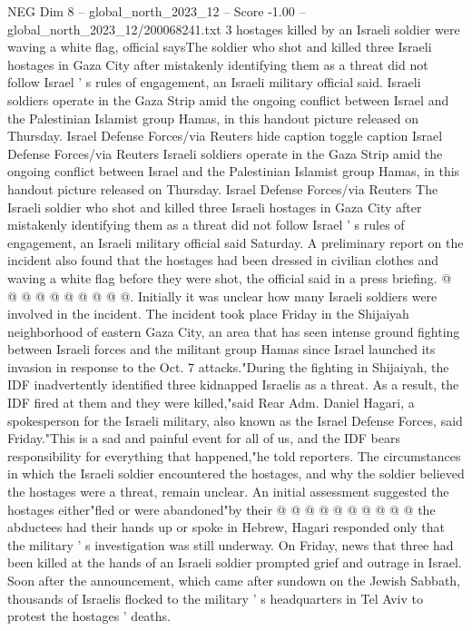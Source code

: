 \begin{textsample}{NEG Dim 8 – global\_north\_2023\_12 – Score -1.00 – global\_north\_2023\_12/200068241.txt}  \label{ex:f8_neg_171}
3 hostages killed by an Israeli soldier were waving a white flag, official saysThe soldier who shot and killed three Israeli hostages in Gaza City after mistakenly identifying them as a threat did not follow Israel ' s rules of engagement, an Israeli military official said.
Israeli soldiers operate in the Gaza Strip amid the ongoing conflict between Israel and the Palestinian Islamist group Hamas, in this handout picture released on Thursday.
Israel Defense Forces/via Reuters hide caption toggle caption Israel Defense Forces/via Reuters Israeli soldiers operate in the Gaza Strip amid the ongoing conflict between Israel and the Palestinian Islamist group Hamas, in this handout picture released on Thursday.
Israel Defense Forces/via Reuters The Israeli soldier who shot and killed three Israeli hostages in Gaza City after mistakenly identifying them as a threat did not follow Israel ' s rules of engagement, an Israeli military official said Saturday.
A preliminary report on the incident also found that the hostages had been dressed in civilian clothes and waving a white flag before they were shot, the official said in a press briefing. @ @ @ @ @ @ @ @ @ @.
Initially it was unclear how many Israeli soldiers were involved in the incident.
The incident took place Friday in the Shijaiyah neighborhood of eastern Gaza City, an area that has seen intense ground fighting between Israeli forces and the militant group Hamas since Israel launched its invasion in response to the Oct. 7 attacks."During the fighting in Shijaiyah, the IDF inadvertently identified three kidnapped Israelis as a threat.
As a result, the IDF fired at them and they were killed,"said Rear Adm.
Daniel Hagari, a spokesperson for the Israeli military, also known as the Israel Defense Forces, said Friday."This is a sad and painful event for all of us, and the IDF bears responsibility for everything that happened,"he told reporters.
The circumstances in which the Israeli soldier encountered the hostages, and why the soldier believed the hostages were a threat, remain unclear.
An initial assessment suggested the hostages either"fled or were abandoned"by their @ @ @ @ @ @ @ @ @ @ the abductees had their hands up or spoke in Hebrew, Hagari responded only that the military ' s investigation was still underway.
On Friday, news that three had been killed at the hands of an Israeli soldier prompted grief and outrage in Israel.
Soon after the announcement, which came after sundown on the Jewish Sabbath, thousands of Israelis flocked to the military ' s headquarters in Tel Aviv to protest the hostages ' deaths.

\end{textsample}

